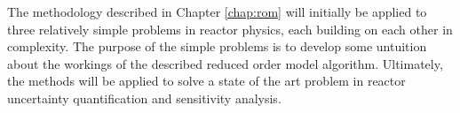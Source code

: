 The methodology described in Chapter \ref{chap:rom} will initially be applied to three relatively simple problems in reactor physics, each building on each other in complexity. The purpose of the simple problems is to develop some untuition about the workings of the described reduced order model algorithm. Ultimately, the methods will be applied to solve a state of the art problem in reactor uncertainty quantification and sensitivity analysis.
 